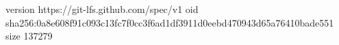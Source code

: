 version https://git-lfs.github.com/spec/v1
oid sha256:0a8e608f91c093c13fc7f0cc3f6ad1df3911d0eebd470943d65a76410bade551
size 137279
